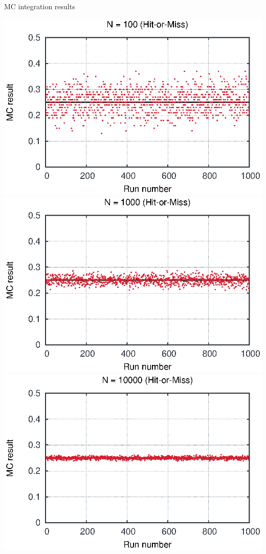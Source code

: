 \begin{emptyslide}{MC integration results}
\null\vfill

  \twocolumn
  {
    \includegraphics[width=\columnwidth]{figures/int100.eps}
    \includegraphics[width=\columnwidth]{figures/int1000.eps}
  }
  {
    \includegraphics[width=\columnwidth]{figures/int10000.eps}
}
\end{emptyslide}
